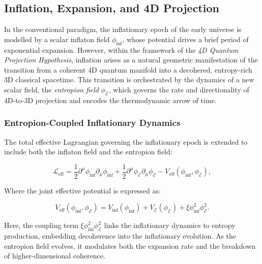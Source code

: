 \documentclass[12pt]{article}
\begin{document}
\newpage
\subsection{Inflation, Expansion, and 4D Projection}
\label{subsec:inflation_expansion_4d_projection}

In the conventional paradigm, the inflationary epoch of the early universe is modelled by a scalar inflaton field \(\phi_{\text{inf}}\), whose potential drives a brief period of exponential expansion. However, within the framework of the \emph{4D Quantum Projection Hypothesis}, inflation arises as a natural geometric manifestation of the transition from a coherent 4D quantum manifold into a decohered, entropy-rich 3D classical spacetime. This transition is orchestrated by the dynamics of a new scalar field, the \emph{entropion field} \(\phi_{\mathcal{E}}\), which governs the rate and directionality of 4D-to-3D projection and encodes the thermodynamic arrow of time.

\subsubsection*{Entropion-Coupled Inflationary Dynamics}

The total effective Lagrangian governing the inflationary epoch is extended to include both the inflaton field and the entropion field:

\begin{equation}
\label{eq:lagrangian_total}
\mathcal{L}_{\text{eff}} = \frac{1}{2} \partial^\mu \phi_{\text{inf}} \partial_\mu \phi_{\text{inf}} + \frac{1}{2} \partial^\mu \phi_{\mathcal{E}} \partial_\mu \phi_{\mathcal{E}} - V_{\text{eff}}(\phi_{\text{inf}}, \phi_{\mathcal{E}}),
\end{equation}

Where the joint effective potential is expressed as:

\begin{equation}
\label{eq:potential_coupled}
V_{\text{eff}}(\phi_{\text{inf}}, \phi_{\mathcal{E}}) = V_{\text{inf}}(\phi_{\text{inf}}) + V_{\mathcal{E}}(\phi_{\mathcal{E}}) + \xi \phi_{\text{inf}}^2 \phi_{\mathcal{E}}^2.
\end{equation}

Here, the coupling term \(\xi \phi_{\text{inf}}^2 \phi_{\mathcal{E}}^2\) links the inflationary dynamics to entropy production, embedding decoherence into the inflationary evolution. As the entropion field evolves, it modulates both the expansion rate and the breakdown of higher-dimensional coherence.
\end{document}
